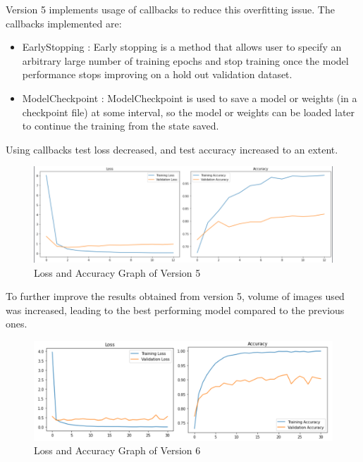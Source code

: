 Version 5 implements usage of callbacks to reduce this overfitting issue. The callbacks implemented are:
\begin{itemize}
    \item EarlyStopping : Early stopping is a method that allows user to specify an arbitrary large number of training epochs and stop training once the model performance stops improving on a hold out validation dataset.
    \item ModelCheckpoint : ModelCheckpoint is used to save a model or weights (in a checkpoint file) at some interval, so the model or weights can be loaded later to continue the training from the state saved.
\end{itemize}
Using callbacks test loss decreased, and test accuracy increased to an extent.
\begin{figure}[H]
\includegraphics[scale=0.6]{Photos/v5.PNG}
\caption{Loss and Accuracy Graph of Version 5} \label{fig:v5}
\end{figure}

To further improve the results obtained from version 5, volume of images used was increased, leading to the best performing model compared to the previous ones.
\begin{figure}[H]
\includegraphics[scale=0.35]{Photos/v6.png}
\caption{Loss and Accuracy Graph of Version 6} \label{fig:v6}
\end{figure}
    
